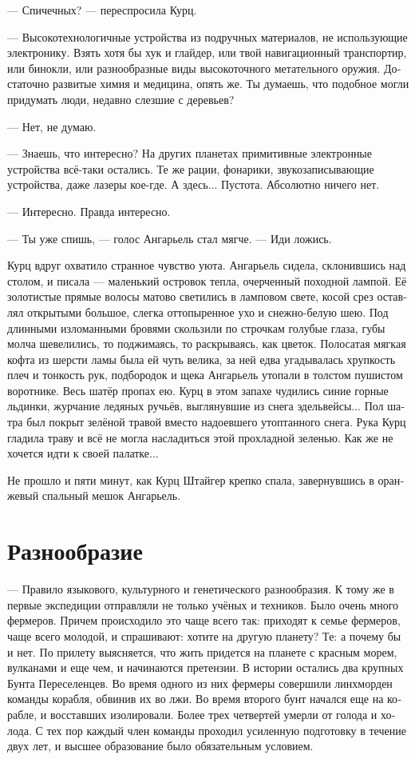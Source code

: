\documentclass[a4paper,12pt,fleqn]{book}\usepackage{cooltooltips}\usepackage{polyglossia}\setdefaultlanguage[babelshorthands=true]{russian}\setotherlanguage{english}\defaultfontfeatures{Ligatures=TeX,Mapping=tex-text} \usepackage{xcolor}\definecolor{lightgray}{HTML}{bbbbbb}\color{lightgray}\newcommand{\ml}[3]{\textenglish{\textcolor{black}{#3}}}
\begin{document}
--- Спичечных? --- переспросила Курц.

--- Высокотехнологичные устройства из подручных материалов, не использующие электронику.
Взять хотя бы хук и глайдер, или твой навигационный транспортир, или бинокли, или разнообразные виды высокоточного метательного оружия.
Достаточно развитые химия и медицина, опять же.
Ты думаешь, что подобное могли придумать люди, недавно слезшие с деревьев?

--- Нет, не думаю.

--- Знаешь, что интересно?
На других планетах примитивные электронные устройства всё-таки остались.
Те же рации, фонарики, звукозаписывающие устройства, даже лазеры кое-где.
А здесь...
Пустота.
Абсолютно ничего нет.

--- Интересно.
Правда интересно.

--- Ты уже спишь, --- голос Ангарьель стал мягче.
--- Иди ложись.

Курц вдруг охватило странное чувство уюта.
Ангарьель сидела, склонившись над столом, и писала --- маленький островок тепла, очерченный походной лампой.
Её золотистые прямые волосы матово светились в ламповом свете, косой срез оставлял открытыми большое, слегка оттопыренное ухо и снежно-белую шею.
Под длинными изломанными  бровями скользили по строчкам голубые глаза, губы молча шевелились, то поджимаясь, то раскрываясь, как цветок.
Полосатая мягкая кофта из шерсти ламы была ей чуть велика, за ней едва угадывалась хрупкость плеч и тонкость рук, подбородок и щека Ангарьель утопали в толстом пушистом воротнике.
Весь шатёр пропах ею.
Курц в этом запахе чудились синие горные льдинки, журчание ледяных ручьёв, выглянувшие из снега эдельвейсы...
Пол шатра был покрыт зелёной травой вместо надоевшего утоптанного снега.
Рука Курц гладила траву и всё не могла насладиться этой прохладной зеленью.
Как же не хочется идти к своей палатке...

Не прошло и пяти минут, как Курц Штайгер крепко спала, завернувшись в оранжевый спальный мешок Ангарьель.

\section{Разнообразие}

--- Правило языкового, культурного и генетического разнообразия.
К тому же в первые экспедиции отправляли не только учёных и техников.
Было очень много фермеров.
Причем происходило это чаще всего так: приходят к семье фермеров, чаще всего молодой, и спрашивают: хотите на другую планету?
Те: а почему бы и нет.
По прилету выясняется, что жить придется на планете с красным морем, вулканами и еще чем,  и начинаются претензии.
В истории остались два крупных Бунта Переселенцев.
Во время одного из них фермеры совершили линхморден команды корабля, обвинив их во лжи.
Во время второго бунт начался еще на корабле, и восставших изолировали.
Более трех четвертей умерли от голода и холода.
С тех пор каждый член команды проходил усиленную подготовку в течение двух лет, и высшее образование было обязательным условием.
\end{document}
